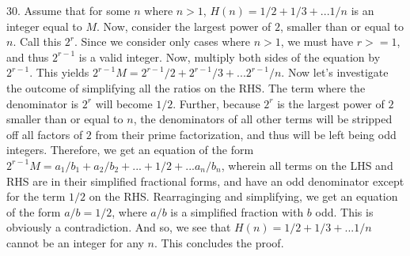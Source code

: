 \documentclass{article}
\begin{document}
30. Assume that for some $n$ where $n > 1$, $H(n) = 1 / 2 + 1 / 3 + ... 1 / n$ is an integer equal to $M$. Now, consider the largest power of $2$, smaller than or equal to $n$. Call this $2^r$. Since we consider only cases where $n > 1$, we must have $r >= 1$, and thus $2^{r - 1}$ is a valid integer. Now, multiply both sides of the equation by $2^{r - 1}$. This yields $2^{r - 1}M = 2^{r - 1} / 2 + 2^{r - 1} / 3 + ... 2^{r - 1} / n$. Now let's investigate the outcome of simplifying all the ratios on the RHS. The term where the denominator is $2^r$ will become $1 / 2$. Further, because $2^r$ is the largest power of $2$ smaller than or equal to $n$, the denominators of all other terms will be stripped off all factors of $2$ from their prime factorization, and thus will be left being odd integers. Therefore, we get an equation of the form $2^{r - 1}M = a_1 / b_1 + a_2 / b_2 + ... + 1 / 2 + ... a_n / b_n$, wherein all terms on the LHS and RHS are in their simplified fractional forms, and have an odd denominator except for the term $1 / 2$ on the RHS. Rearraginging and simplifying, we get an equation of the form $a / b = 1 / 2$, where $a / b$ is a simplified fraction with $b$ odd. This is obviously a contradiction. And so, we see that $H(n) = 1 / 2 + 1 / 3 + ... 1 / n$ cannot be an integer for any $n$. This concludes the proof.
\end{document}
